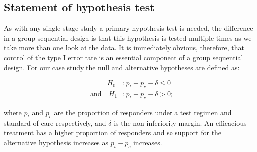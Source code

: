\documentclass{article}
\begin{document}
\subsection{Statement of hypothesis test}
As with any single stage study a primary hypothesis test is needed, the difference in a group sequential design is that this hypothesis is tested multiple times as we take more than one look at the data. It is immediately obvious, therefore, that control of the type I error rate is an essential component of a group sequential design.  For our case study the null and alternative hypotheses are defined as: 
\begin{fleqn}
\begin{align}
&&H_ 0&: p_t - p_c -\delta\le{0}\label{hyp1}\\
&\text{and}&\ H_ 1&: p_t - p_c -\delta>0;\label{hyp2}
\end{align}
\end{fleqn} 
where $p_t$ and $p_c$ are the proportion of responders under a test regimen and standard of care respectively, and $\delta$ is the non-inferiority margin. An efficacious treatment has a higher proportion of responders and so support for the alternative hypothesis increases as $p_t-p_c$ increases. 
\end{document}
